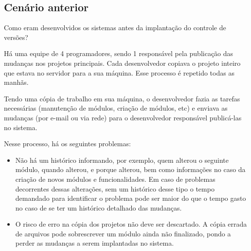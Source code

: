 \subsection{Cenário anterior}

Como eram desenvolvidos os sistemas antes da implantação do controle de versões?

Há uma equipe de 4 programadores, sendo 1 responsável pela publicação das mudanças nos projetos principais. Cada desenvolvedor copiava o projeto inteiro que estava no servidor para a sua máquina. Esse processo é repetido todas as manhãs.

Tendo uma cópia de trabalho em sua máquina, o desenvolvedor fazia as tarefas necessárias (manutenção de módulos, criação de módulos, etc) e enviava as mudanças (por e-mail ou via rede) para o desenvolvedor responsável publicá-las no sistema.

Nesse processo, há os seguintes problemas:

\begin{itemize}
\item Não há um histórico informando, por exemplo, quem alterou o seguinte módulo, quando alterou, e porque alterou, bem como informações no caso da criação de novos módulos e funcionalidades. Em caso de problemas decorrentes dessas alterações, sem um histórico desse tipo o tempo demandado para identificar o problema pode ser maior do que o tempo gasto no caso de se ter um histórico detalhado das mudanças.

\item O risco de erro na cópia dos projetos não deve ser descartado. A cópia errada de arquivos pode sobrescrever um módulo ainda não finalizado, pondo a perder as mudanças a serem implantadas no sistema.
\end{itemize}

